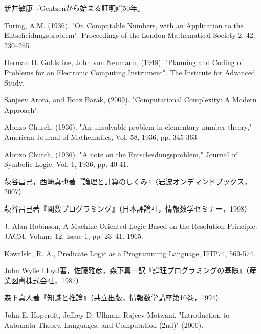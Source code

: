 \documentclass[uplatex, 12pt, dvipdfmx]{jsreport}
\begin{document}
\begin{thebibliography}{99}
    新井敏康『Gentzenから始まる証明論50年』

    Turing, A.M. (1936). 
    "On Computable Numbers, with an Application to the Entscheidungsproblem". 
    Proceedings of the London Mathematical Society 2, 42: 230–265.

    Herman H. Goldstine, John von Neumann, (1948). 
    "Planning and Coding of Problems for an Electronic Computing Instrument". 
    The Institute for Advanced Study.

    Sanjeev Arora, and Boaz Barak, (2009). 
    "Computational Complexity: A Modern Approach". 

    Alonzo Church, (1936).
    "An unsolvable problem in elementary number theory," American Journal of Mathematics, Vol. 58, 1936, pp. 345-363.

    Alonzo Church, (1936).
    "A note on the Entscheidungsproblem," Journal of Symbolic Logic, Vol. 1, 1936, pp. 40-41.

    萩谷昌己，西崎真也著『論理と計算のしくみ』（岩波オンデマンドブックス，2007）

    萩谷昌己著『関数プログラミング』（日本評論社，情報数学セミナー，1998）

    J. Alan Robinson, A Machine-Oriented Logic Based on the Resolution Principle. JACM, Volume 12, Issue 1, pp. 23–41. 1965.

    Kowalski, R. A., Predicate Logic as a Programming Language, IFIP74, 569-574.

    John Wylie Lloyd著，佐藤雅彦，森下真一訳『論理プログラミングの基礎』（産業図書株式会社，1987）

    森下真人著『知識と推論』（共立出版，情報数学講座第10巻，1994）

    John E. Hopcroft, Jeffrey D. Ullman, Rajeev Motwani, "Introduction to Automata Theory, Languages, and Computation (2nd)" (2000).
\end{thebibliography}
\end{document}
